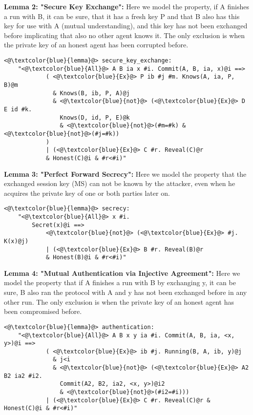 \textbf{Lemma 2: "Secure Key Exchange":} Here we model the property, if A finishes a run with B, it can be sure, that it has a fresh key P and that B also has this key for use with A (mutual understanding), and this key has not been exchanged before implicating that also no other agent knows it. The only exclusion is when the private key of an honest agent has been corrupted before.

\begin{lstlisting}
<@\textcolor{blue}{lemma}@> secure_key_exchange:
    "<@\textcolor{blue}{All}@> A B ia x #i. Commit(A, B, ia, x)@i ==> 
            ( <@\textcolor{blue}{Ex}@> P ib #j #m. Knows(A, ia, P, B)@m 
              & Knows(B, ib, P, A)@j
              & <@\textcolor{blue}{not}@> (<@\textcolor{blue}{Ex}@> D E id #k. 
                Knows(D, id, P, E)@k 
                & <@\textcolor{blue}{not}@>(#m=#k) & <@\textcolor{blue}{not}@>(#j=#k))
            )
            | (<@\textcolor{blue}{Ex}@> C #r. Reveal(C)@r 
            & Honest(C)@i & #r<#i)" 
\end{lstlisting}


\textbf{Lemma 3: "Perfect Forward Secrecy":} Here we model the property that the exchanged session key (MS) can not be known by the attacker, even when he acquires the private key of one or both parties later on.
\begin{lstlisting}
<@\textcolor{blue}{lemma}@> secrecy:
    "<@\textcolor{blue}{All}@> x #i. 
        Secret(x)@i ==> 
            <@\textcolor{blue}{not}@> (<@\textcolor{blue}{Ex}@> #j. K(x)@j)
            | (<@\textcolor{blue}{Ex}@> B #r. Reveal(B)@r 
            & Honest(B)@i & #r<#i)"

\end{lstlisting}


\textbf{Lemma 4: "Mutual Authentication via Injective Agreement":} Here we model the property that if A finishes a run with B by exchanging y, it can be sure, B also ran the protocol with A and y has not been exchanged before in any other run. The only exclusion is when the private key of an honest agent has been compromised before.

\begin{lstlisting}
<@\textcolor{blue}{lemma}@> authentication:
    "<@\textcolor{blue}{All}@> A B x y ia #i. Commit(A, B, ia, <x, y>)@i ==> 
            ( <@\textcolor{blue}{Ex}@> ib #j. Running(B, A, ib, y)@j
              & j<i
              & <@\textcolor{blue}{not}@> (<@\textcolor{blue}{Ex}@> A2 B2 ia2 #i2. 
                Commit(A2, B2, ia2, <x, y>)@i2 
                & <@\textcolor{blue}{not}@>(#i2=#i)))
            | (<@\textcolor{blue}{Ex}@> C #r. Reveal(C)@r & Honest(C)@i & #r<#i)"

\end{lstlisting}


